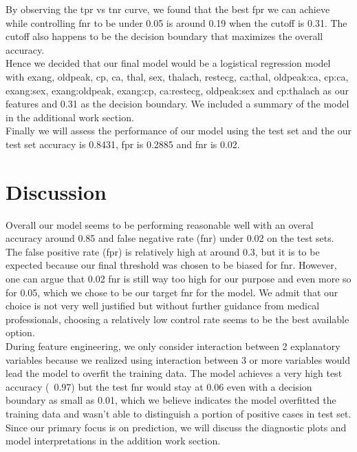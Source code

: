 \documentclass{article}
\begin{document}
By observing the tpr vs tnr curve, we found that the best fpr
we can achieve while controlling fnr to be under 0.05
is around 0.19 when the cutoff is 0.31. The cutoff also happens to be
the decision boundary that maximizes the overall accuracy.\\


Hence we decided that our final model would be a logistical regression model
with exang, oldpeak, cp, ca, thal, sex, thalach, restecg, ca:thal, oldpeak:ca,
cp:ca, exang:sex, exang:oldpeak, exang:cp, ca:restecg, oldpeak:sex and cp:thalach
as our features and 0.31 as the decision boundary.
We included a summary of the model in the additional work section.\\

Finally we will assess the performance of our model using the test set
and the our test set accuracy is 0.8431, fpr is 0.2885 and fnr is 0.02.


\section{Discussion}
Overall our model seems to be performing reasonable well with an overal accuracy
around 0.85 and false negative rate (fnr) under 0.02 on the test sets.
The false positive rate (fpr) is relatively high at around 0.3,
but it is to be expected because our final threshold was chosen
to be biased for fnr.
However, one can argue that 0.02 fnr is still way too high for our purpose
and even more so for 0.05, which we chose to be our target fnr for the model.
We admit that our choice is not very well justified but without further guidance
from medical professionals, choosing a relatively low control rate seems
to be the best available option.\\


During feature engineering, we only consider interaction between 2 explanatory
variables because we realized using interaction between 3 or more variables
would lead the model to overfit the training data. The model achieves a very
high test accuracy (~0.97) but the test fnr would stay at 0.06 even
with a decision boundary as small as 0.01, which we believe indicates the model
overfitted the training data and wasn't able to distinguish a portion of positive
cases in test set. \\

Since our primary focus is on prediction, we will discuss the diagnostic plots
and model interpretations in the addition work section. \\
\end{document}
